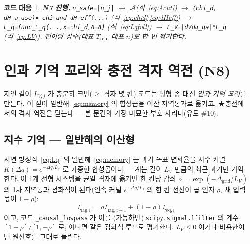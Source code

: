 \documentclass[11pt,a4paper]{article}
\newtheorem*{codebox}{코드 대응}
\newcommand{\eq}{\mathrm{eq}}
\newcommand{\rep}{\mathrm{rep}}
\newcommand{\code}[1]{\texttt{#1}}
\begin{document}
\begin{codebox}
\textbf{N7 진행.} \code{n\_safe=|n\_j|} $\to$ $\mathcal A$(식~\eqref{eq:Acut}) $\to$
\code{(chi\_d, dH\_a\_use)=\_chi\_and\_dH\_eff(...)} (식~\eqref{eq:chid}$\cdot$\eqref{eq:dHeff}) $\to$
\code{L\_q=func\_L\_q(...,x=chi\_d,A=A)} (식~\eqref{eq:Lqfull}) $\to$ \code{L\_V=|dVdq\_qa|*L\_q} (식~\eqref{eq:LV}).
전이당 \emph{상수}(대표 $T_\rep\cdot$대표 $n$)로 한 번 평가한다.
\end{codebox}

\section{인과 기억 꼬리와 충전 격자 역전 (N8)}\label{sec:tail}
지연 길이 $L_{V,j}$ 가 충분히 크면($\ge$ 격자 몇 칸) 코드는 평형 종 대신 \emph{인과 기억 꼬리}를 만든다. 이 절이
일반해~\eqref{eq:memory} 의 합성곱을 이산 저역통과로 옮기고, ★충전에서의 격자 역전을 닫는다 --- 본 문건의 가장 미묘한
부호 자리다(유도 \#10).

\subsection{지수 기억 — 일반해의 이산형}
지연 방정식~\eqref{eq:Lq} 의 일반해~\eqref{eq:memory} 는 과거 목표 변화율을 지수 커널 $K(\Delta q)=e^{-\Delta q/L_q}$ 로
가중한 합성곱이다 --- 계는 길이 $L_{V}$ 만큼의 최근 과거만 기억한다. 이 1계 선형 시스템을 균일 격자에 옮기면 한 칸당
감쇠 $\rho=\exp(-\Delta_\mathrm{grid}/L_V)$ 의 1차 저역통과 점화식이 된다(연속 커널 $e^{-\Delta q/L_q}$ 의 한 칸
전진이 곱 인자 $\rho$, 새 입력 몫이 $1-\rho$):
\begin{equation}
\xi_{\mathrm{lag},i}=\rho\,\xi_{\mathrm{lag},i-1}+(1-\rho)\,\xi_{\eq,i}
\label{eq:lowpass}
\end{equation}
이고, 코드 \code{\_causal\_lowpass} 가 이를 (가능하면) \code{scipy.signal.lfilter} 의 계수
$[1-\rho]/[1,-\rho]$ 로, 아니면 같은 점화식 루프로 평가한다. $L_V\le0$ 이거나 비유한이면 원신호를 그대로 돌린다.
\end{document}
